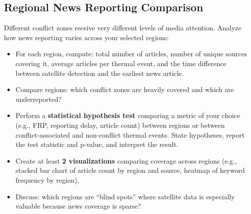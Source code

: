 \documentclass[11pt]{article}
\begin{document}
\subsection{Regional News Reporting Comparison}
Different conflict zones receive very different levels of media attention. Analyze how news reporting varies across your selected regions:
\begin{itemize}
  \item For each region, compute: total number of articles, number of unique sources covering it, average articles per thermal event, and the time difference between satellite detection and the earliest news article.
  \item Compare regions: which conflict zones are heavily covered and which are underreported?
  \item Perform a \textbf{statistical hypothesis test} comparing a metric of your choice (e.g., FRP, reporting delay, article count) between regions or between conflict-associated and non-conflict thermal events. State hypotheses, report the test statistic and p-value, and interpret the result.
  \item Create at least \textbf{2 visualizations} comparing coverage across regions (e.g., stacked bar chart of article count by region and source, heatmap of keyword frequency by region).
  \item Discuss: which regions are ``blind spots'' where satellite data is especially valuable because news coverage is sparse?
\end{itemize}
\end{document}
